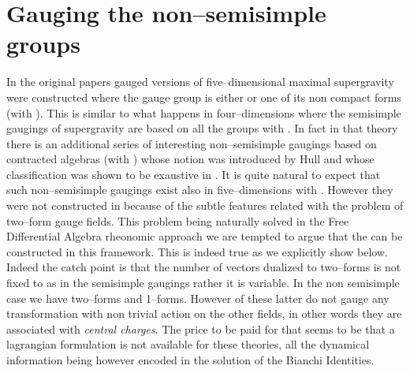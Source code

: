 \documentclass[a4paper,12pt]{article}
\begin{document}
\section{Gauging the non--semisimple \coordHE{} groups}
In the original papers \cite{gunwar,PPV} gauged versions of
five--dimensional maximal supergravity were constructed where the
gauge group is either \coordHE{} or one of its non compact
forms \coordHE{} (with \coordHE{}). This is similar to what
happens in four--dimensions where the semisimple gaugings of
\coordHE{} supergravity are based on all the groups
\coordHE{} with \coordHE{}. In fact in that theory there is
an additional series of interesting non--semisimple gaugings based
on contracted algebras \coordHE{} (with \coordHE{}) whose notion
was introduced by Hull \cite{hull,hull2} and whose classification
was shown to be exaustive in \cite{noi4D}. It is quite natural to
expect that such non--semisimple gaugings exist also in
five--dimensions with \coordHE{}. However they were not constructed
in \cite{gunwar,PPV} because of the subtle features related with
the problem of two--form gauge fields. This problem being
naturally solved in the Free Differential Algebra rheonomic
approach we are tempted to argue that the
\coordHE{} can be constructed in this
framework. This is indeed true as we explicitly show below. Indeed
the catch point is that the number of vectors dualized to
two--forms is not fixed to \coordHE{} as in the semisimple gaugings
rather it is variable. In the non semisimple
\coordHE{} case we have \coordHE{} two--forms and
\coordHE{} 1--forms. However \coordHE{} of these latter do not gauge any
transformation with non trivial action on the other fields, in
other words they are associated with {\it central charges}. The
price to be paid for that seems to be that a lagrangian
formulation is not available for these theories, all the dynamical
information being however encoded in the solution of the Bianchi
Identities.
\end{document}
